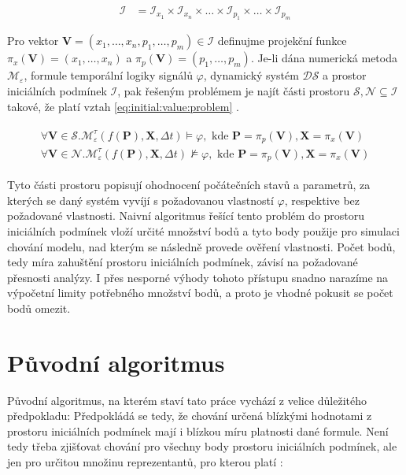 \begin{align}
\mathcal{I} &= \mathcal{I}_{x_1} \times \mathcal{I}_{x_n} \times \ldots \times \mathcal{I}_{p_1} \times \ldots \times \mathcal{I}_{p_m}
\end{align}

Pro vektor $\mathbf{V} = (x_1, \ldots, x_n, p_1, \ldots, p_m) \in \mathcal{I}$ definujme projekční funkce $\pi_x(\mathbf{V}) = (x_1, \ldots, x_n)$
a $\pi_p(\mathbf{V}) = (p_1, \ldots, p_m)$. Je-li dána numerická metoda $\mathcal{M}_\varepsilon$,
formule temporální logiky signálů $\varphi$, dynamický systém $\mathcal{DS}$
a prostor iniciálních podmínek $\mathcal{I}$, pak řešeným problémem je najít
části prostoru $\mathcal{S}, \mathcal{N} \subseteq \mathcal{I}$ takové, že platí
vztah \ref{eq:initial:value:problem} \cite[str. 23]{drazan2011}.

\begin{align}\label{eq:initial:value:problem}
\begin{array}{ll}
\forall \mathbf{V} \in \mathcal{S} . \mathcal{M}^\tau_\varepsilon(f(\mathbf{P}), \mathbf{X}, \Delta t) \models \varphi, \textrm{~kde~} \mathbf{P} = \pi_p(\mathbf{V}), \mathbf{X} = \pi_x(\mathbf{V}) \\
\forall \mathbf{V} \in \mathcal{N} . \mathcal{M}^\tau_\varepsilon(f(\mathbf{P}), \mathbf{X}, \Delta t) \not\models \varphi, \textrm{~kde~} \mathbf{P} = \pi_p(\mathbf{V}), \mathbf{X} = \pi_x(\mathbf{V})
\end{array}
\end{align}

Tyto části prostoru popisují ohodnocení počátečních stavů a parametrů, za kterých se daný systém vyvíjí
s požadovanou vlastností $\varphi$, respektive bez po\-ža\-do\-vané vlastnosti. Naivní algoritmus řešící
tento problém do prostoru iniciálních podmínek vloží určité množství bodů a tyto body
použije pro simulaci chování modelu, nad kterým se následně provede ověření vlastnosti.
Počet bodů, tedy míra zahuštění prostoru iniciálních podmínek, závisí na požadované přesnosti
analýzy. I přes nesporné výhody tohoto přístupu snadno narazíme na výpočetní limity
potřebného množství bodů, a proto je vhodné pokusit se počet bodů omezit.


\section{Původní algoritmus}

Původní algoritmus, na kterém staví tato práce vychází z velice důležitého předpokladu:
 Předpokládá se tedy, že chování určená blízkými
hodnotami z prostoru iniciálních podmínek mají i blízkou míru platnosti dané formule.
Není tedy třeba zjišťovat chování pro všechny body prostoru iniciálních podmínek,
ale jen pro určitou množinu reprezentantů, pro kterou platí \cite[str. 25]{drazan2011}:

